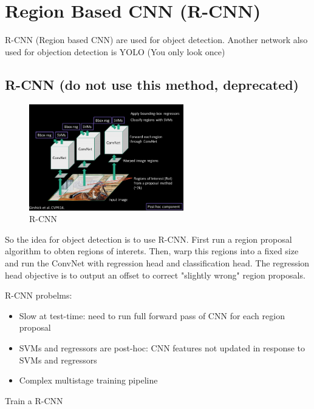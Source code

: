 \chapter{Region Based CNN (R-CNN)}

R-CNN (Region based CNN) are used for object detection. Another network also used for objection detection is YOLO (You only look once)

\section{R-CNN (do not use this method, deprecated)}

\begin{figure}[h]
  \centering
  \includegraphics[width=0.6\textwidth]{Images/region_based_cnn/1.png}
  \caption{R-CNN}
\end{figure}
So the idea for object detection is to use R-CNN. First run a region proposal algorithm to obten regions of interets. Then, warp this regions into a fixed size and run the ConvNet with regression head and classification head. The regression head objective is to output an offset to correct "slightly wrong" region proposals.

R-CNN probelms:
\begin{itemize}
\item Slow at test-time: need to run full forward pass of CNN for each region proposal
\item SVMs and regressors are post-hoc: CNN features not updated in response to SVMs and regressors
\item Complex multistage training pipeline
\end{itemize}


Train a R-CNN

